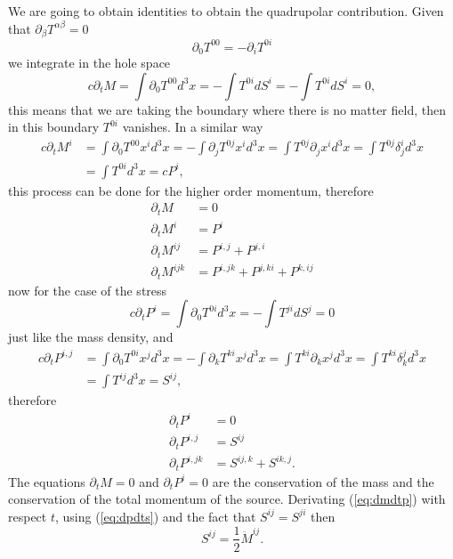 We are going to obtain identities to obtain the quadrupolar contribution.
Given that $\partial_{\beta}T^{\alpha\beta}=0$
\[
\partial_{0}T^{00}=-\partial_{i}T^{0i}
\]
we integrate in the hole space
\[
c\partial_{t}M=\int\partial_{0}T^{00}d^{3}x=-\int T^{0i}dS^{i}=-\int T^{0i}dS^{i}=0,
\]
this means that we are taking the boundary where there is no matter
field, then in this boundary $T^{0i}$ vanishes. In a similar way
\begin{align*}
c\partial_{t}M^{i} & =\int\partial_{0}T^{00}x^{i}d^{3}x=-\int\partial_{j}T^{0j}x^{i}d^{3}x=\int T^{0j}\partial_{j}x^{i}d^{3}x=\int T^{0j}\delta_{j}^{i}d^{3}x\\
\  & =\int T^{0i}d^{3}x=cP^{i},
\end{align*}
this process can be done for the higher order momentum, therefore
\begin{align}
\partial_{t}M & =0\\
\partial_{t}M^{i} & =P^{i}\\
\partial_{t}M^{ij} & =P^{i,j}+P^{j,i}\label{eq:dmdtp}\\
\partial_{t}M^{ijk} & =P^{i,jk}+P^{j,ki}+P^{k,ij}
\end{align}
now for the case of the stress
\[
c\partial_{t}P^{i}=\int\partial_{0}T^{0i}d^{3}x=-\int T^{ji}dS^{j}=0
\]
just like the mass density, and
\begin{align*}
c\partial_{t}P^{i,j} & =\int\partial_{0}T^{0i}x^{j}d^{3}x=-\int\partial_{k}T^{ki}x^{j}d^{3}x=\int T^{ki}\partial_{k}x^{j}d^{3}x=\int T^{ki}\delta_{k}^{j}d^{3}x\\
\  & =\int T^{ij}d^{3}x=S^{ij},
\end{align*}
therefore
\begin{align}
\partial_{t}P^{i} & =0\\
\partial_{t}P^{i,j} & =S^{ij}\label{eq:dpdts}\\
\partial_{t}P^{i,jk} & =S^{ij,k}+S^{ik,j}.
\end{align}
The equations $\partial_{t}M=0$ and $\partial_{t}P^{i}=0$ are the
conservation of the mass and the conservation of the total momentum
of the source. Derivating (\ref{eq:dmdtp}) with respect $t$, using
(\ref{eq:dpdts}) and the fact that $S^{ij}=S^{ji}$ then
\begin{equation}
S^{ij}=\frac{1}{2}\ddot{M}^{ij}.\label{eq:sm}
\end{equation}

